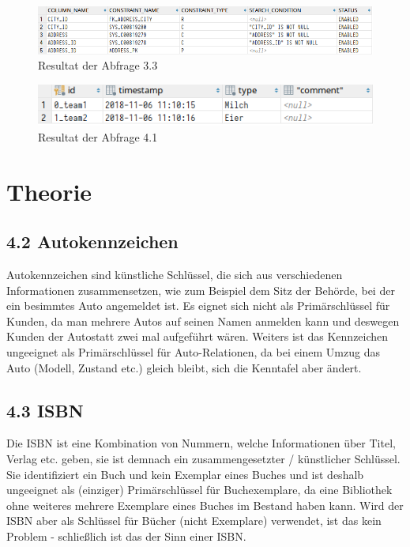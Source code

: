 \documentclass[notitlepage]{article}
\begin{document}
	\begin{figure}[H]\centering
		\includegraphics[width=\textwidth]{images/3_3.png}
		\caption{Resultat der Abfrage 3.3}
	\end{figure}

	\begin{figure}[H]\centering
		\includegraphics[width=\textwidth]{images/4_1.png}
		\caption{Resultat der Abfrage 4.1}
	\end{figure}

	\section*{Theorie}
	\subsection*{4.2 Autokennzeichen}
		Autokennzeichen sind künstliche Schlüssel, die sich aus verschiedenen
		Informationen zusammensetzen, wie zum Beispiel dem Sitz der Behörde, bei der
		ein besimmtes Auto angemeldet ist. Es eignet sich nicht als Primärschlüssel 
		für Kunden, da man mehrere Autos auf seinen Namen anmelden kann und deswegen 
		Kunden der Autostatt zwei mal aufgeführt wären. Weiters ist das Kennzeichen
		ungeeignet als Primärschlüssel für Auto-Relationen, da bei einem Umzug das
		Auto (Modell, Zustand etc.) gleich bleibt, sich die Kenntafel aber ändert.
		
	\subsection*{4.3 ISBN}
		Die ISBN ist eine Kombination von Nummern, welche Informationen über Titel,
		Verlag etc. geben, sie ist demnach ein zusammengesetzter / künstlicher Schlüssel.
		Sie identifiziert ein Buch und kein Exemplar eines Buches und ist deshalb
		ungeeignet als (einziger) Primärschlüssel für Buchexemplare, da eine Bibliothek 
		ohne weiteres mehrere Exemplare eines Buches im Bestand haben kann. Wird der ISBN 
		aber als Schlüssel für Bücher (nicht Exemplare) verwendet, ist das kein Problem - 
		schlie{\ss}lich ist das der Sinn einer ISBN.
\end{document}
